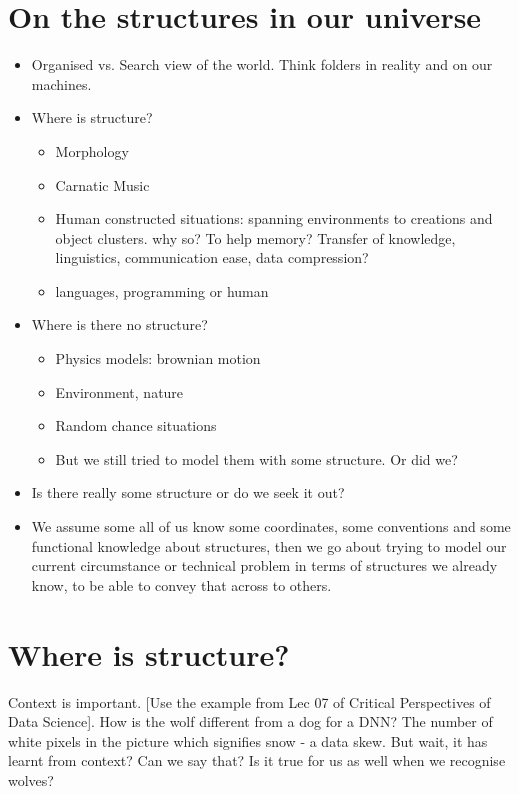 
\renewcommand{\chapterheadstart}{~\vspace{1.7cm}\\}
\section{On the structures in our universe}
\begin{itemize}
\item Organised vs. Search view of the world. Think folders in reality and on our machines.
\item Where is structure?
\begin{itemize}
\item Morphology
\item Carnatic Music
\item Human constructed situations: spanning environments to creations and object clusters. why 
so? To help memory? Transfer of knowledge, linguistics, communication ease, data compression?
\item languages, programming or human
\end{itemize}
\item Where is there no structure?
\begin{itemize}
\item Physics models: brownian motion
\item Environment, nature
\item Random chance situations
\item But we still tried to model them with some structure. Or did we?
\end{itemize}
\item Is there really some structure or do we seek it out?
\item We assume some all of us know some coordinates, some conventions and some functional knowledge about structures, then we go about trying to model our current circumstance or technical problem in terms of structures we already know, to be able to convey that across to others.
\end{itemize} 
\section{Where is structure?}
Context is important. [Use the example from Lec 07 of Critical Perspectives of Data Science]. How is the wolf different from a dog for a DNN? The number of white pixels in the picture which signifies snow - a data skew. But wait, it has learnt from context? Can we say that? Is it true for us as well when we recognise wolves?

